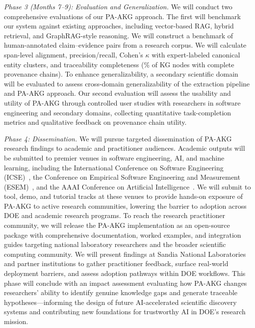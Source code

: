 \documentclass{files/proposalnsf}
\begin{document}
\textit{Phase 3 (Months 7--9): Evaluation and Generalization.}
We will conduct two comprehensive evaluations of our PA-AKG approach. The first will benchmark our system against existing approaches, including vector-based RAG, hybrid retrieval, and GraphRAG-style reasoning. We will construct a benchmark of human-annotated claim--evidence pairs from a research corpus. We will calculate span-level alignment, precision/recall, Cohen's $\kappa$ with expert-labeled canonical entity clusters, and traceability completeness (\ie \% of KG nodes with complete provenance chains). To enhance generalizability, a secondary scientific domain will be evaluated to assess cross-domain generalizability of the extraction pipeline and PA-AKG approach. Our second evaluation will assess the usability and utility of PA-AKG through controlled user studies with researchers in software engineering and secondary domains, collecting quantitative task-completion metrics and qualitative feedback on provenance chain utility.

\textit{Phase 4: Dissemination.}
We will pursue targeted dissemination of PA-AKG research findings to academic and practitioner audiences. Academic outputs will be submitted to premier venues in software engineering, AI, and machine learning, including the International Conference on Software Engineering (ICSE)~\cite{}, the Conference on Empirical Software Engineering and Measurement (ESEM)~\cite{}, and the AAAI Conference on Artificial Intelligence~\cite{}. We will submit to tool, demo, and tutorial tracks at these venues to provide hands-on exposure of PA-AKG to active research communities, lowering the barrier to adoption across DOE and academic research programs. To reach the research practitioner community, we will release the PA-AKG implementation as an open-source package with comprehensive documentation, worked examples, and integration guides targeting national laboratory researchers and the broader scientific computing community. We will present findings at Sandia National Laboratories and partner institutions to gather practitioner feedback, surface real-world deployment barriers, and assess adoption pathways within DOE workflows. This phase will conclude with an impact assessment evaluating how PA-AKG changes researchers' ability to identify genuine knowledge gaps and generate traceable hypotheses---informing the design of future AI-accelerated scientific discovery systems and contributing new foundations for trustworthy AI in DOE's research mission. 
\end{document}
